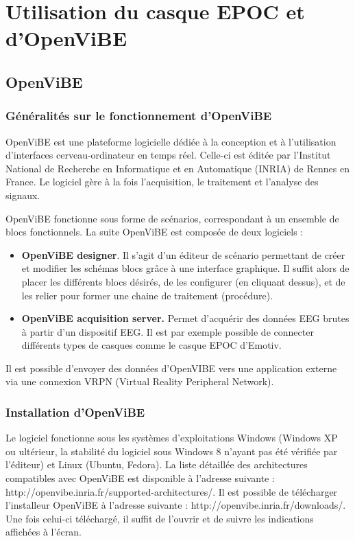 \chapter{Utilisation du casque EPOC et d'OpenViBE}
\label{Chapitre : Utilisation du casque EPOC et d'OpenViBE}
\thispagestyle{fancy}

\section{OpenViBE}
\label{Section : 5.OpenViBE}

\subsection{Généralités sur le fonctionnement d'OpenViBE}
\label{Subsection : 5.Généralités sur le fonctionnement d'OpenViBE}
OpenViBE est une plateforme logicielle dédiée à la conception et à l'utilisation d'interfaces cerveau-ordinateur en temps réel. Celle-ci est éditée par l'Institut National de Recherche en Informatique et en Automatique (INRIA) de Rennes en France. Le logiciel gère à la fois l'acquisition, le traitement et l'analyse des signaux.

OpenViBE fonctionne sous forme de scénarios, correspondant à un ensemble de blocs fonctionnels. La suite OpenViBE est composée de deux logiciels : 
\smallbreak
\begin{itemize}
	\item \textbf{OpenViBE designer}. Il s'agit d'un éditeur de scénario permettant de  créer et modifier les schémas blocs grâce à une interface graphique. Il suffit alors de placer les différents blocs désirés, de les configurer (en cliquant dessus), et de les relier pour former une chaine de traitement (procédure).
	\smallbreak
	\item \textbf{OpenViBE acquisition server.} Permet d'acquérir des données EEG brutes à partir d'un dispositif EEG. Il est par exemple possible de connecter différents types de casques comme le casque EPOC d'Emotiv.
	\smallbreak
\end{itemize}

Il est possible d'envoyer des données d'OpenVIBE vers une application externe via une connexion VRPN (Virtual Reality Peripheral Network).

\subsection{Installation d'OpenViBE}
\label{Subsection : 5.Installation d'OpenViBE}
 Le logiciel fonctionne sous les systèmes d'exploitations Windows (Windows XP ou ultérieur, la stabilité du logiciel sous Windows 8 n'ayant pas été vérifiée par l'éditeur) et Linux (Ubuntu, Fedora). La liste détaillée des architectures compatibles avec OpenViBE est disponible à l'adresse suivante : http://openvibe.inria.fr/supported-architectures/.
Il est possible de télécharger l'installeur OpenViBE à l'adresse suivante : http://openvibe.inria.fr/downloads/. Une fois celui-ci téléchargé, il suffit de l'ouvrir et de suivre les indications affichées à l'écran.

